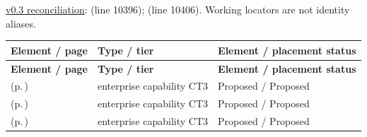 \hyperref[model:reconciliation]{v0.3 reconciliation}: \texttt{} (line 10396); \texttt{} (line 10406). Working locators are not identity aliases.
\begingroup\small\setlength{\TableWidth}{\dimexpr\linewidth-6\tabcolsep-4\arrayrulewidth\relax}
\begin{longtable}{|>{\raggedright\arraybackslash}p{0.52\TableWidth}|>{\raggedright\arraybackslash}p{0.2\TableWidth}|>{\raggedright\arraybackslash}p{0.28\TableWidth}|}
\hline\rowcolor{TableHead}\textbf{Element / page} & \textbf{Type / tier} & \textbf{Element / placement status}\\\hline\endfirsthead
\hline\rowcolor{TableHead}\textbf{Element / page} & \textbf{Type / tier} & \textbf{Element / placement status}\\\hline\endhead
\hline\endfoot
\nameref{cap:ec-operational-fulfilment-definition} (p.\,\pageref{cap:ec-operational-fulfilment-definition}) & enterprise capability CT3 & Proposed / Proposed\\\hline
\nameref{cap:ec-governed-activity-execution-control} (p.\,\pageref{cap:ec-governed-activity-execution-control}) & enterprise capability CT3 & Proposed / Proposed\\\hline
\nameref{cap:ec-entity-relative-operational-progression} (p.\,\pageref{cap:ec-entity-relative-operational-progression}) & enterprise capability CT3 & Proposed / Proposed\\\hline
\end{longtable}\endgroup


